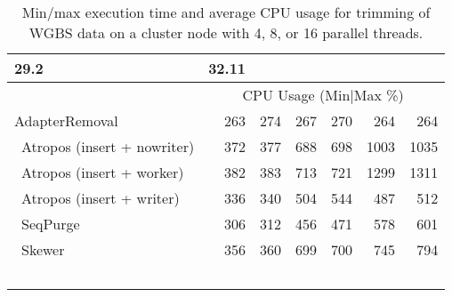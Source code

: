 \begin{table}[ht]
\begin{tabular}{lr|rr|rr|r}
        
        29.2
        & 32.11
        
        \\\hline
    
    \hfill{} & \multicolumn{6}{c}{CPU Usage (Min$|$Max \%)} \\\hline
    
        AdapterRemoval &
        
        263
        & 274 &
        
        
        267
        & 270 &
        
        
        264
        & 264
        
        \\\    
        Atropos (insert + nowriter) &
        
        372
        & 377 &
        
        
        688
        & 698 &
        
        
        1003
        & 1035
        
        \\\    
        Atropos (insert + worker) &
        
        382
        & 383 &
        
        
        713
        & 721 &
        
        
        1299
        & 1311
        
        \\\    
        Atropos (insert + writer) &
        
        336
        & 340 &
        
        
        504
        & 544 &
        
        
        487
        & 512
        
        \\\    
        SeqPurge &
        
        306
        & 312 &
        
        
        456
        & 471 &
        
        
        578
        & 601
        
        \\\    
        Skewer &
        
        356
        & 360 &
        
        
        699
        & 700 &
        
        
        745
        & 794
        
        \\\    
\end{tabular}
\caption{Min/max execution time and average CPU usage for trimming of WGBS data on a cluster node with 4, 8, or 16 parallel threads.\label{tab:real-performance-wgbs}}
\end{table}
